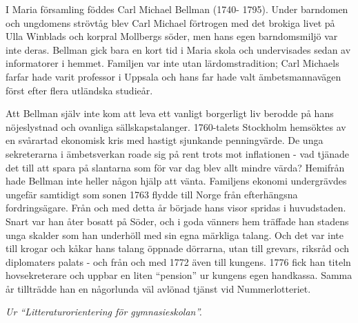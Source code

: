 \vspace{10pt}
\hspace{10pt}I Maria församling föddes Carl Michael Bellman (1740-
1795). Under barndomen och ungdomens strövtåg blev Carl 
Michael förtrogen med det brokiga livet på Ulla Winblads och 
korpral Mollbergs söder, men hans egen barndomsmiljö var inte 
deras. Bellman gick bara en kort tid i Maria skola och 
undervisades sedan av informatorer i hemmet. Familjen var inte 
utan lärdomstradition; Carl Michaels farfar hade varit professor i 
Uppsala och hans far hade valt ämbetsmannavägen först efter 
flera utländska studieår.\par
\hspace{10pt} Att Bellman själv inte kom att leva ett vanligt borgerligt 
liv berodde på hans nöjeslystnad och ovanliga sällskapstalanger. 
1760-talets Stockholm hemsöktes av en svårartad ekonomisk kris 
med hastigt sjunkande penningvärde. De unga sekreterarna i 
ämbetsverkan roade sig på rent trots mot inflationen - vad 
tjänade det till att spara på slantarna som för var dag blev 
allt mindre värda? Hemifrån hade Bellman inte heller någon 
hjälp att vänta. Familjens ekonomi undergrävdes ungefär samtidigt som 
sonen 1763 flydde till Norge från efterhängsna fordringsägare. 
Från och med detta år började hans visor spridas i huvudstaden. 
Snart var han åter bosatt på Söder, och i goda vänners hem 
träffade han stadens unga skalder som han underhöll med sin 
egna märkliga talang. Och det var inte till krogar och kåkar hans 
talang öppnade dörrarna, utan till grevars, riksråd och 
diplomaters palats - och från och med 1772 även till kungens. 
1776 fick han titeln hovsekreterare och uppbar en liten 
``pension'' ur kungens egen handkassa. Samma år tillträdde han en 
någorlunda väl avlönad tjänst vid Nummerlotteriet.\par
\vspace{10pt}
\hfill{\footnotesize\textit{Ur ``Litteraturorientering för gymnasieskolan''.}}
